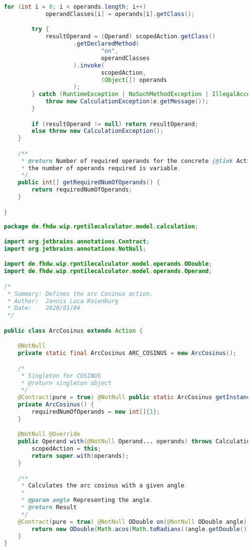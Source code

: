 \begin{lstlisting}[caption=Action (Schwenke),label=list:Action,language=Java]
        for (int i = 0; i < operands.length; i++)
            operandClasses[i] = operands[i].getClass();

        try {
            resultOperand = (Operand) scopedAction.getClass()
                    .getDeclaredMethod(
                            "on",
                            operandClasses
                    ).invoke(
                            scopedAction,
                            (Object[]) operands
                    );
        } catch (RuntimeException | NoSuchMethodException | IllegalAccessException | InvocationTargetException e) {
            throw new CalculationException(e.getMessage());
        }

        if (resultOperand != null) return resultOperand;
        else throw new CalculationException();
    }

    /**
     * @return Number of required operands for the concrete {@link Action}. If {@code -1}
     * the number of operands required is variable.
     */
    public int[] getRequiredNumOfOperands() {
        return requiredNumOfOperands;
    }

}
\end{lstlisting}    

\begin{lstlisting}[caption=ArcCosinus (Keienburg),label=list:ArcCosinus,language=Java]
package de.fhdw.wip.rpntilecalculator.model.calculation;

import org.jetbrains.annotations.Contract;
import org.jetbrains.annotations.NotNull;

import de.fhdw.wip.rpntilecalculator.model.operands.ODouble;
import de.fhdw.wip.rpntilecalculator.model.operands.Operand;

/*
 * Summary: Defines the arc Cosinus action.
 * Author:  Jannis Luca Keienburg
 * Date:    2020/01/04
 */

public class ArcCosinus extends Action {

    @NotNull
    private static final ArcCosinus ARC_COSINUS = new ArcCosinus();

    /*
     * Singleton for COSINUS
     * @return singleton object
     */
    @Contract(pure = true) @NotNull public static ArcCosinus getInstance() { return ARC_COSINUS; }
    private ArcCosinus() {
        requiredNumOfOperands = new int[]{1};
    }

    @NotNull @Override
    public Operand with(@NotNull Operand... operands) throws CalculationException {
        scopedAction = this;
        return super.with(operands);
    }

    /**
     * Calculates the arc cosinus with a given angle.
     *
     * @param angle Representing the angle.
     * @return Result
     */
    @Contract(pure = true) @NotNull ODouble on(@NotNull ODouble angle) {
        return new ODouble(Math.acos(Math.toRadians((angle.getDouble()))));
    }
}
\end{lstlisting}    

